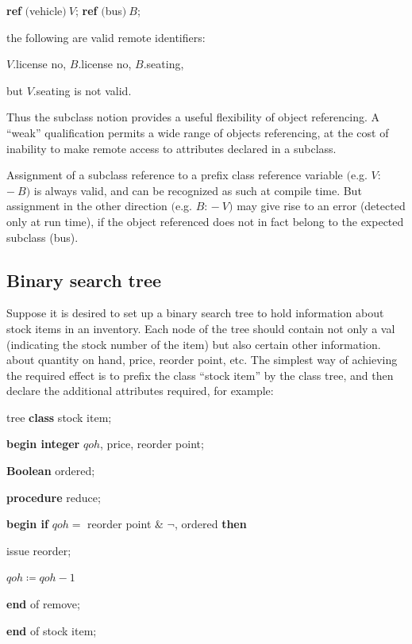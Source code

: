 \documentclass[twoside,11pt]{book}
\begin{document}
\quad \quad \textbf{ref} $($vehicle$)\ V$; \textbf{ref} $($bus$)\ B$;

\quad the following are valid remote identifiers:

\quad \quad $V$.license no, $B$.license no, $B$.seating,

\quad but $V$.seating is not valid.

\noindent
Thus the subclass notion provides a useful flexibility of object referencing. A ``weak'' qualification permits a wide range of objects referencing, at the cost of inability to make remote access to attributes declared in a subclass.

Assignment of a subclass reference to a prefix class reference variable $($e.g. $V$: $-\ B)$ is always valid, and can be recognized as such at compile time. But assignment in the other direction $($e.g. $B$: $-\ V)$ may give rise to an error (detected only at run time), if the object referenced does not in fact belong to the expected subclass (bus).

\subsection{Binary search tree}

Suppose it is desired to set up a binary search tree to hold information about stock items in an inventory. Each node of the tree should contain not only a val (indicating the stock number of the item) but also certain other information. about quantity on hand, price, reorder point, etc. The simplest way of achieving the required effect is to prefix the class ``stock item'' by the class tree, and then declare the additional attributes required, for example:

\quad tree \textbf{class} stock item;

\quad \quad \textbf{begin integer} $qoh$, price, reorder point;

\quad \quad \quad \textbf{Boolean} ordered;

\quad \quad \quad \textbf{procedure} reduce;

\quad \quad \quad \quad \textbf{begin if} $qoh =$ reorder point \& $\neg$, ordered \textbf{then}

\quad \quad \quad \quad \quad issue reorder;

\quad \quad \quad \quad \quad $qoh \coloneq qoh -1$

\quad \quad \quad \quad \textbf{end} of remove;

\quad \quad \textbf{end} of stock item;
\end{document}
